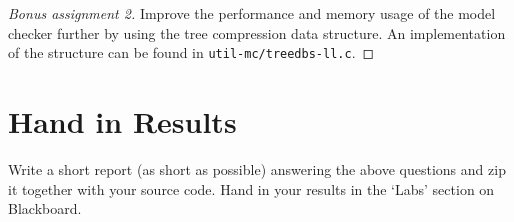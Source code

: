 \documentclass[12pt]{article}
\begin{document}
\begin{proof}[Bonus assignment 2]
Improve the performance and memory usage of the model checker further by using
the tree compression data structure. An implementation of the structure 
can be found in \texttt{util-mc/treedbs-ll.c}.
\end{proof}



\section{Hand in Results}

Write a short report (as short as possible) answering the above questions and zip it together with
your source code.
Hand in your results in the `Labs' section on Blackboard.





\end{document}
